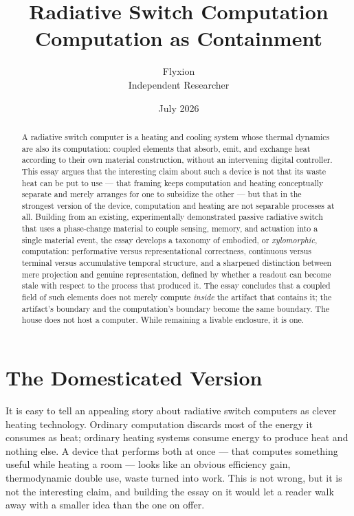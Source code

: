 \documentclass[11pt]{article}
\title{\textbf{Radiative Switch Computation}\\[4pt]
\large Computation as Containment}
\author{Flyxion \\ \small Independent Researcher}
\date{July 2026}
\begin{document}
\maketitle

\begin{abstract}
\noindent A radiative switch computer is a heating and cooling system whose thermal dynamics are also its computation: coupled elements that absorb, emit, and exchange heat according to their own material construction, without an intervening digital controller. This essay argues that the interesting claim about such a device is not that its waste heat can be put to use --- that framing keeps computation and heating conceptually separate and merely arranges for one to subsidize the other --- but that in the strongest version of the device, computation and heating are not separable processes at all. Building from an existing, experimentally demonstrated passive radiative switch that uses a phase-change material to couple sensing, memory, and actuation into a single material event, the essay develops a taxonomy of embodied, or \emph{xylomorphic}, computation: performative versus representational correctness, continuous versus terminal versus accumulative temporal structure, and a sharpened distinction between mere projection and genuine representation, defined by whether a readout can become stale with respect to the process that produced it. The essay concludes that a coupled field of such elements does not merely compute \emph{inside} the artifact that contains it; the artifact's boundary and the computation's boundary become the same boundary. The house does not host a computer. While remaining a livable enclosure, it is one.
\end{abstract}

\section{The Domesticated Version}

It is easy to tell an appealing story about radiative switch computers as clever heating technology. Ordinary computation discards most of the energy it consumes as heat; ordinary heating systems consume energy to produce heat and nothing else. A device that performs both at once --- that computes something useful while heating a room --- looks like an obvious efficiency gain, thermodynamic double use, waste turned into work. This is not wrong, but it is not the interesting claim, and building the essay on it would let a reader walk away with a smaller idea than the one on offer.
\end{document}
